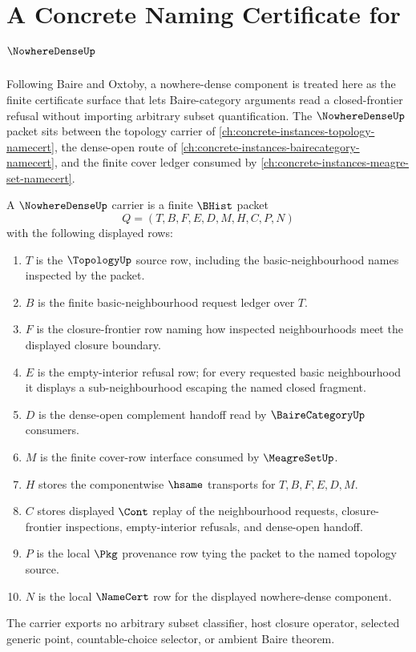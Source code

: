 \chapter{A Concrete Naming Certificate for $\NowhereDenseUp$}
\label{ch:concrete-instances-nowhere-dense-namecert}

Following Baire and Oxtoby, a nowhere-dense component is treated here as the finite certificate surface that lets Baire-category arguments read a closed-frontier refusal without importing arbitrary subset quantification. The $\NowhereDenseUp$ packet sits between the topology carrier of \autoref{ch:concrete-instances-topology-namecert}, the dense-open route of \autoref{ch:concrete-instances-bairecategory-namecert}, and the finite cover ledger consumed by \autoref{ch:concrete-instances-meagre-set-namecert}.

\begin{definition}
\label{def:nowhere-dense-carrier}
A $\NowhereDenseUp$ carrier is a finite $\BHist$ packet
$$
Q=(T,B,F,E,D,M,H,C,P,N)
$$
with the following displayed rows:
\begin{enumerate}
\item $T$ is the $\TopologyUp$ source row, including the basic-neighbourhood names inspected by the packet.
\item $B$ is the finite basic-neighbourhood request ledger over $T$.
\item $F$ is the closure-frontier row naming how inspected neighbourhoods meet the displayed closure boundary.
\item $E$ is the empty-interior refusal row; for every requested basic neighbourhood it displays a sub-neighbourhood escaping the named closed fragment.
\item $D$ is the dense-open complement handoff read by $\BaireCategoryUp$ consumers.
\item $M$ is the finite cover-row interface consumed by $\MeagreSetUp$.
\item $H$ stores the componentwise $\hsame$ transports for $T,B,F,E,D,M$.
\item $C$ stores displayed $\Cont$ replay of the neighbourhood requests, closure-frontier inspections, empty-interior refusals, and dense-open handoff.
\item $P$ is the local $\Pkg$ provenance row tying the packet to the named topology source.
\item $N$ is the local $\NameCert$ row for the displayed nowhere-dense component.
\end{enumerate}
The carrier exports no arbitrary subset classifier, host closure operator, selected generic point, countable-choice selector, or ambient Baire theorem.
\end{definition}


